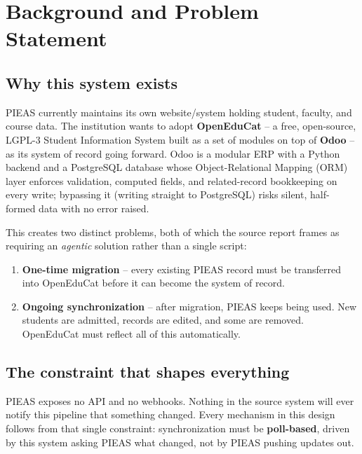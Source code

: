 \documentclass[11pt,a4paper]{article}
\begin{document}
\section{Background and Problem Statement}

\subsection{Why this system exists}

PIEAS currently maintains its own website/system holding student, faculty, and course data.
The institution wants to adopt \textbf{OpenEduCat} -- a free, open-source, LGPL-3 Student
Information System built as a set of modules on top of \textbf{Odoo} -- as its system of record
going forward. Odoo is a modular ERP with a Python backend and a PostgreSQL database whose
Object-Relational Mapping (ORM) layer enforces validation, computed fields, and related-record
bookkeeping on every write; bypassing it (writing straight to PostgreSQL) risks silent,
half-formed data with no error raised.

This creates two distinct problems, both of which the source report frames as requiring an
\emph{agentic} solution rather than a single script:

\begin{enumerate}[leftmargin=1.4em]
    \item \textbf{One-time migration} -- every existing PIEAS record must be transferred into
          OpenEduCat before it can become the system of record.
    \item \textbf{Ongoing synchronization} -- after migration, PIEAS keeps being used. New
          students are admitted, records are edited, and some are removed. OpenEduCat must
          reflect all of this automatically.
\end{enumerate}

\subsection{The constraint that shapes everything}

PIEAS exposes no API and no webhooks. Nothing in the source system will ever notify this
pipeline that something changed. Every mechanism in this design follows from that single
constraint: synchronization must be \textbf{poll-based}, driven by this system asking PIEAS what
changed, not by PIEAS pushing updates out.
\end{document}
